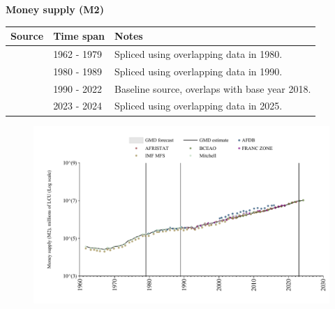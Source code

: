 \documentclass[12pt,a4paper,landscape]{article}
\begin{document}
\begin{adjustbox}{max totalsize={\paperwidth}{\paperheight},center}
\begin{minipage}[t][\textheight][t]{\textwidth}
\vspace*{0.5cm}
{}
\begin{center}
{\Large\bfseries Money supply (M2)}
\end{center}
\vspace{0.5cm}
\begin{table}[H]
\centering
\small
\begin{tabular}{|l|l|l|}
\hline
\textbf{Source} & \textbf{Time span} & \textbf{Notes} \\
\hline
\rowcolor{white}\cite{IMF_MFS}& 1962 - 1979 &Spliced using overlapping data in 1980. \\
\rowcolor{lightgray}\cite{AFDB}& 1980 - 1989 &Spliced using overlapping data in 1990. \\
\rowcolor{white}\cite{AFRISTAT}& 1990 - 2022 &Baseline source, overlaps with base year 2018. \\
\rowcolor{lightgray}\cite{BCEAO}& 2023 - 2024 &Spliced using overlapping data in 2025. \\
\hline
\end{tabular}
\end{table}
\begin{figure}[H]
\centering
\includegraphics[width=\textwidth,height=0.6\textheight,keepaspectratio]{graphs/SEN_M2.pdf}
\end{figure}
\end{minipage}
\end{adjustbox}
\end{document}
